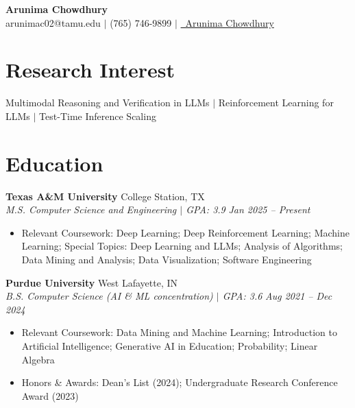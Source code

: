 \documentclass[10pt,letterpaper]{article}
\newcommand{\heading}[4]{%
  \noindent\textbf{#1} \hfill #2\\
  \textit{#3} \hfill \textit{#4}\par
}
\begin{document}

\begin{center}
  {\Large \textbf{Arunima Chowdhury}}\\[2pt]
  arunimac02@tamu.edu $|$ (765) 746-9899 $|$
  \href{https://linkedin.com/in/arunima-chowdhury}{\faLinkedin\ Arunima Chowdhury}
\end{center}
\vspace{-8pt}


\section{Research Interest}
Multimodal Reasoning and Verification in LLMs $|$ Reinforcement Learning for LLMs $|$ Test-Time Inference Scaling

\section{Education}

\heading{Texas A\&M University}{College Station, TX}{M.S. Computer Science and Engineering $|$ GPA: 3.9}{Jan 2025 -- Present}
\begin{itemize}
  \item Relevant Coursework: Deep Learning; Deep Reinforcement Learning; Machine Learning; Special Topics: Deep Learning and LLMs; Analysis of Algorithms; Data Mining and Analysis; Data Visualization; Software Engineering
\end{itemize}

\heading{Purdue University}{West Lafayette, IN}{B.S. Computer Science (AI \& ML concentration) $|$ GPA: 3.6}{Aug 2021 -- Dec 2024}
\begin{itemize}
  \item Relevant Coursework: Data Mining and Machine Learning; Introduction to Artificial Intelligence; Generative AI in Education; Probability; Linear Algebra
  \item Honors \& Awards: Dean's List (2024); Undergraduate Research Conference Award (2023)
\end{itemize}
\end{document}
